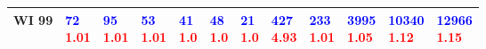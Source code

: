 \begin{tabular}{llllllllllll}
WI 99  &   \makecell{\textcolor{blue}{72} \\ \textcolor{red}{1.01}} &   \makecell{\textcolor{blue}{95} \\ \textcolor{red}{1.01}} &   \makecell{\textcolor{blue}{53} \\ \textcolor{red}{1.01}} &    \makecell{\textcolor{blue}{41} \\ \textcolor{red}{1.0}} &    \makecell{\textcolor{blue}{48} \\ \textcolor{red}{1.0}} &    \makecell{\textcolor{blue}{21} \\ \textcolor{red}{1.0}} &   \makecell{\textcolor{blue}{427} \\ \textcolor{red}{4.93}} &   \makecell{\textcolor{blue}{233} \\ \textcolor{red}{1.01}} &   \makecell{\textcolor{blue}{3995} \\ \textcolor{red}{1.05}} &  \makecell{\textcolor{blue}{10340} \\ \textcolor{red}{1.12}} &  \makecell{\textcolor{blue}{12966} \\ \textcolor{red}{1.15}} \\
\bottomrule
\end{tabular}
